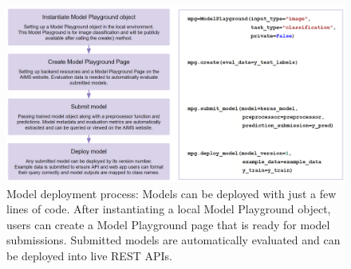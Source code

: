 \begin{figure}
  \centering
  \includegraphics[width=1\textwidth]{figures/fig_aims_code_new.png}
  \caption{Model deployment process: Models can be deployed with just a few lines of code. After instantiating a local Model Playground object, users can create a Model Playground page that is ready for model submissions. Submitted models are automatically evaluated and can be deployed into live REST APIs.}
  \label{fig:fig_code_example}
\end{figure}

